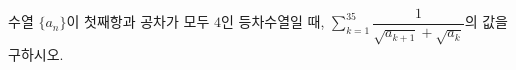 수열 $\{a_n\}$이 첫째항과 공차가 모두 $4$인 등차수열일 때, $\displaystyle\sum_{k=1}^{35}\dfrac{1}{\sqrt{a_{k+1}}+\sqrt{a_k}}$의 값을 구하시오.
